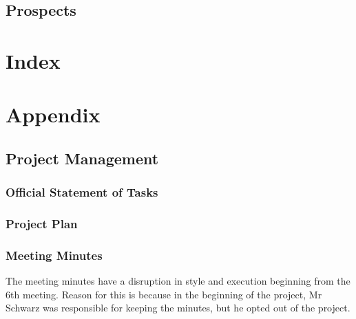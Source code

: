\documentclass[10pt,a4paper,titlepage,twoside,english,final]{zhawreprt}
\begin{document}
\section{Prospects}\label{sec:Prospects}


\chapter{Index}\label{chp:Index}
\label{sec:Bibliography}
\newpage
\printglossary\label{sec:Glossary}
\newpage
\listoffigures\label{sec:ListOfFigures}
\newpage
\lstlistoflistings\label{sec:ListOfListings}
\newpage
\printglossary[title=SymbolGlossary,type=symbols]\label{sec:SymbolGlossary}
\newpage
\printglossary[title=Acronym Glossary,type=\acronymtype]\label{sec:AcronymGlossary}
\newpage
\printindex\label{sec:Index}

\appendix
\chapter{Appendix}\label{chp:Appendix}
\section{Project Management}\label{sec:ProjectManagement}

\subsection{Official Statement of Tasks}\label{ssec:OfficialStatementOfTasks}

\subsection{Project Plan}\label{ssec:ProjectPlan}


\subsection{Meeting Minutes}\label{ssec:MeetingMinutes}
The meeting minutes have a disruption in style and execution beginning from the 6th meeting.
Reason for this is because in the beginning of the project, Mr Schwarz was responsible for keeping the minutes, but he opted out of the project.










\end{document}

